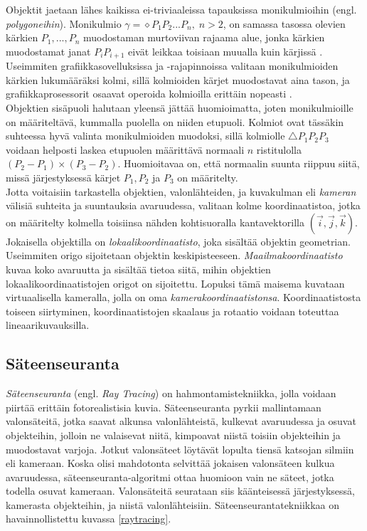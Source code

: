 \documentclass[a4paper, 12pt, titlepage]{article}
\begin{document}
Objektit jaetaan lähes kaikissa ei-triviaaleissa tapauksissa monikulmioihin (engl. \emph{polygoneihin}). Monikulmio $\gamma = \diamond P_1P_2...P_n, \; n > 2$, on samassa tasossa olevien kärkien $P_1,...,P_n$ muodostaman murtoviivan rajaama alue, jonka kärkien muodostamat janat $P_i P_{i+1}$ eivät leikkaa toisiaan muualla kuin kärjissä \citep{harju}. Useimmiten grafiikkasovelluksissa ja -rajapinnoissa valitaan monikulmioiden kärkien lukumääräksi kolmi, sillä kolmioiden kärjet muodostavat aina tason, ja grafiikkaprosessorit osaavat operoida kolmioilla erittäin nopeasti \citep{angel}.\\

Objektien sisäpuoli halutaan yleensä jättää huomioimatta, joten monikulmioille on määriteltävä, kummalla puolella on niiden etupuoli. Kolmiot ovat tässäkin suhteessa hyvä valinta monikulmioiden muodoksi, sillä kolmiolle $\triangle P_1P_2P_3$ voidaan helposti laskea etupuolen määrittävä normaali $n$ ristitulolla $(P_2-P_1) \times (P_3-P_2)$. Huomioitavaa on, että normaalin suunta riippuu siitä, missä järjestyksessä kärjet $P_1, P_2$ ja $P_3$ on määritelty. \citep[.]{hughes}\\

Jotta voitaisiin tarkastella objektien, valonlähteiden, ja kuvakulman eli \emph{kameran} välisiä suhteita ja suuntauksia avaruudessa, valitaan kolme koordinaatistoa, jotka on määritelty kolmella toisiinsa nähden kohtisuoralla kantavektorilla $(\vec{i},\vec{j},\vec{k})$. Jokaisella objektilla on \emph{lokaalikoordinaatisto}, joka sisältää objektin geometrian. Useimmiten origo sijoitetaan objektin keskipisteeseen. \emph{Maailmakoordinaatisto} kuvaa koko avaruutta ja sisältää tietoa siitä, mihin objektien lokaalikoordinaatistojen origot on sijoitettu. Lopuksi tämä maisema kuvataan virtuaalisella kameralla, jolla on oma \emph{kamerakoordinaatistonsa}. Koordinaatistosta toiseen siirtyminen, koordinaatistojen skaalaus ja rotaatio voidaan toteuttaa lineaarikuvauksilla. \citep[.]{janke}

\subsection{Säteenseuranta}

\emph{Säteenseuranta} (engl. \emph{Ray Tracing}) on hahmontamistekniikka, jolla voidaan piirtää erittäin fotorealistisia kuvia. Säteenseuranta pyrkii mallintamaan valonsäteitä, jotka saavat alkunsa valonlähteistä, kulkevat avaruudessa ja osuvat objekteihin, jolloin ne valaisevat niitä, kimpoavat niistä toisiin objekteihin ja muodostavat varjoja. Jotkut valonsäteet löytävät lopulta tiensä katsojan silmiin eli kameraan. Koska olisi mahdotonta selvittää jokaisen valonsäteen kulkua avaruudessa, säteenseuranta-algoritmi ottaa huomioon vain ne säteet, jotka todella osuvat kameraan. Valonsäteitä seurataan siis käänteisessä järjestyksessä, kamerasta objekteihin, ja niistä valonlähteisiin. Säteenseurantatekniikkaa on havainnollistettu kuvassa \ref{raytracing}. \citep[.]{janke}\\
\end{document}
